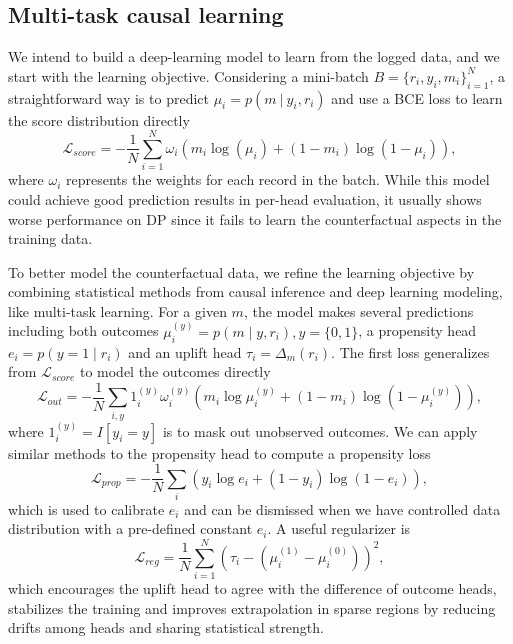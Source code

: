 \documentclass[sigconf, authorversion]{acmart}
\begin{document}
\subsection{Multi-task causal learning} \label{sec:loss_design}
We intend to build a deep-learning model to learn from the logged data, and we start with the learning objective.
Considering a mini-batch $B=\{r_i,y_i,m_i\}_{i=1}^N$, a straightforward way is to predict $\mu_i = p(m~|~y_i,r_i)$ and use a BCE loss to learn the score distribution directly
\begin{equation}
    \mathcal{L}_{score} = -\frac{1}{N}\sum_{i=1}^N \omega_i\left(m_i\log(\mu_i) + (1-m_i)\log(1-\mu_i)\right),
\end{equation}
where $\omega_i$ represents the weights for each record in the batch. While this model could achieve good prediction results in per-head evaluation, it usually shows worse performance on DP since it fails to learn the counterfactual aspects in the training data. 

To better model the counterfactual data, we refine the learning objective by combining statistical methods from causal inference and deep learning modeling, like multi-task learning. For a given $m$, the model makes several predictions including both outcomes $\mu_i^{(y)} = p(m\mid y, r_i), y=\{0,1\}$, a propensity head $e_i =p(y=1\mid r_i)$ and an uplift head $\tau_i=\Delta_m(r_i)$. The first loss generalizes from $\mathcal{L}_{score}$ to model the outcomes directly
\begin{equation}
    \mathcal{L}_{out} = -\frac{1}{N}\sum_{i,y} 1_i^{(y)}\omega_i^{(y)} \left(m_i\log \mu_i^{(y)} + (1-m_i)\log(1-\mu_i^{(y)})\right),
\end{equation}
where $1_i^{(y)}=I[y_i=y]$ is to mask out unobserved outcomes. We can apply similar methods to the propensity head to compute a propensity loss
\begin{equation}
    \mathcal{L}_{prop} = -\frac{1}{N}\sum_i\left(y_i\log e_i + (1-y_i)\log (1-e_i)\right),
\end{equation}
which is used to calibrate $e_i$ and can be dismissed when we have controlled data distribution with a pre-defined constant $e_i$. A useful regularizer is
\begin{equation}
    \mathcal{L}_{reg} = \frac{1}{N} \sum_{i=1}^N\left(\tau_i-\left(\mu_i^{(1)}-\mu_i^{(0)}\right)\right)^2,
\end{equation}
which encourages the uplift head to agree with the difference of outcome heads, stabilizes the training and improves extrapolation in sparse regions by reducing drifts among heads and sharing statistical strength.
\end{document}
